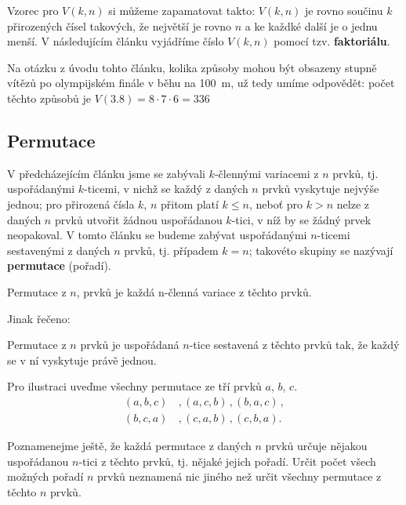       Vzorec pro \(V(k,n)\) si můžeme zapamatovat takto: \(V(k,n)\) je rovno součinu \(k\)
      přirozených čísel takových, že největší je rovno \(n\) a ke každké další je o jednu menší. V
      následujícím článku vyjádříme číslo \(V(k,n)\) pomocí tzv. \textbf{faktoriálu}. 

      Na otázku z úvodu tohto článku, kolika způsoby mohou být obsazeny stupně vítězů po olympijském
      finále v běhu na \SI{100}{\meter}, už tedy umíme odpovědět: počet těchto způsobů je \(V(3.8) =
      8\cdot7\cdot6=336\)

      
    
      \subsection{Permutace}\label{mai:IchapIVsecIssecIII}
        V předcházejícím článku jsme se zabývali \(k\)-člennými variacemi z \(n\) prvků, tj.
        uspořádanými \(k\)-ticemi, v nichž se každý z daných \(n\) prvků vyskytuje nejvýše jednou;
        pro přirozená čísla \(k\), \(n\) přitom platí \(k \leq n\), neboť pro \(k > n\) nelze z
        daných \(n\) prvků utvořit žádnou uspořádanou \(k\)-tici, v níž by se žádný prvek
        neopakoval. V tomto článku se budeme zabývat uspořádanými \(n\)-ticemi sestavenými z daných
        \(n\) prvků, tj. případem \(k = n\); takovéto skupiny se nazývají \textbf{permutace}
        (pořadí).
        \begin{mdframed}[style=highlight]
          Permutace z \(n\), prvků je každá n-členná variace z těchto prvků.
        \end{mdframed}
        Jinak řečeno:
        \begin{mdframed}[style=highlight]
          Permutace z \(n\) prvků je uspořádaná \(n\)-tice sestavená z těchto prvků tak, že každý se
          v ní vyskytuje právě jednou.
        \end{mdframed}

        Pro ilustraci uveďme všechny permutace ze tří prvků \(a\), \(b\), \(c\).
        \begin{align*}
          (a,b,c)\, &, (a,c,b)\,, (b,a,c)\,, \\
          (b,c,a)\, &, (c,a,b)\,, (c,b,a).
        \end{align*}        

        Poznamenejme ještě, že každá permutace z daných \(n\) prvků určuje nějakou uspořádanou
        \(n\)-tici z těchto prvků, tj. nějaké jejich pořadí. Určit počet všech možných pořadí \(n\)
        prvků neznamená nic jiného než určit všechny permutace z těchto \(n\) prvků. 
        
